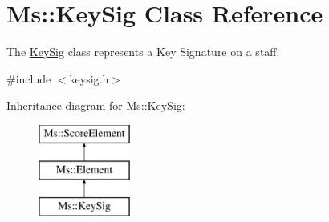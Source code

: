 \hypertarget{class_ms_1_1_key_sig}{}\section{Ms\+:\+:Key\+Sig Class Reference}
\label{class_ms_1_1_key_sig}


The \hyperlink{class_ms_1_1_key_sig}{Key\+Sig} class represents a Key Signature on a staff.  




{\ttfamily \#include $<$keysig.\+h$>$}

Inheritance diagram for Ms\+:\+:Key\+Sig\+:\begin{figure}[H]
\begin{center}
\leavevmode
\includegraphics[height=3.000000cm]{class_ms_1_1_key_sig}
\end{center}
\end{figure}
